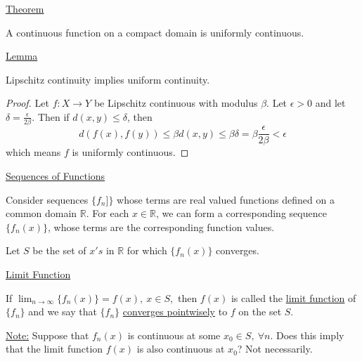 \documentclass[twoside]{article}
\begin{document}
\underline{Theorem}

A continuous function on a compact domain is uniformly continuous.

\underline{Lemma}

Lipschitz continuity implies uniform continuity.

\begin{proof}
    Let $f : X \to Y$ be Lipschitz continuous with modulus $\beta$. Let $\epsilon > 0$ and let $\delta = \frac{\epsilon}{2 \beta}$. Then if $d(x,y) \leq \delta$, then
    \[
    d(f(x), f(y)) \leq \beta d(x,y) \leq \beta \delta = \beta  \frac{\epsilon}{2 \beta}< \epsilon 
    \]
    which means $f$ is uniformly continuous.
\end{proof}

\underline{Sequences of Functions}

Consider sequences $\{ f_n ]\}$ whose terms are real valued functions defined on a common domain $\mathbb{R}$. For each $x \in \mathbb{R}$, we can form a corresponding sequence $\{f_n(x)\}$, whose terms are the corresponding function values.

Let $S$ be the set of $x's$ in $\mathbb{R}$ for which $\{ f_n (x) \}$ converges.

\underline{Limit Function}

If $
    \lim_{n \to \infty}  \{ f_n(x) \} = f(x), ~ x \in S,
$
then $f(x)$ is called the \underline{limit function} of $\{ f_n \}$ and we say that $\{ f_n \}$ \underline{converges pointwisely} to $f$ on the set $S$.

\underline{Note:} Suppose that $f_n(x)$ is continuous at some $x_0 \in S, ~\forall n$. Does this imply that the limit function $f(x)$ is also continuous at $x_{0}$? Not necessarily.
\end{document}
